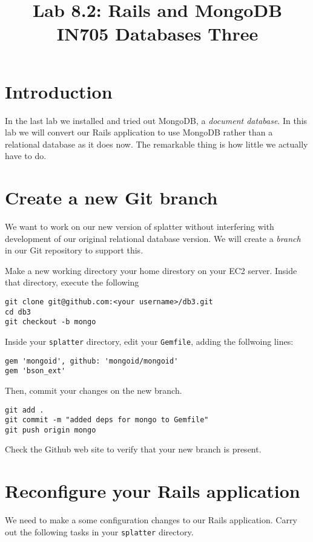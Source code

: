 \documentclass{article}
\begin{document}
\title{Lab 8.2: Rails and MongoDB\\ IN705 Databases Three}
\date{}
\maketitle

\section*{Introduction}
In the last lab we installed and tried out MongoDB, a \emph{document database}.  In this lab we will convert
our Rails application to use MongoDB rather than a relational database as it does now.  The remarkable thing 
is how little we actually have to do.

\section{Create a new Git branch}
We want to work on our new version of splatter without interfering with development of our original relational database version.  We will create a \emph{branch} in our Git repository to support this.

Make a new working directory your home direstory on your EC2 server.  Inside that directory, execute the
following

\begin{verbatim}
git clone git@github.com:<your username>/db3.git
cd db3
git checkout -b mongo
\end{verbatim}

Inside your \texttt{splatter} directory, edit your \texttt{Gemfile}, adding the follwoing lines:

\begin{verbatim}
gem 'mongoid', github: 'mongoid/mongoid'
gem 'bson_ext'
\end{verbatim}

Then, commit your changes on the new branch.

\begin{verbatim}
git add .
git commit -m "added deps for mongo to Gemfile"
git push origin mongo
\end{verbatim}

Check the Github web site to verify that your new branch is present.

\section{Reconfigure your Rails application}
We need to make a some configuration changes to our Rails application. Carry out the 
following tasks in your \texttt{splatter} directory.
\end{document}
